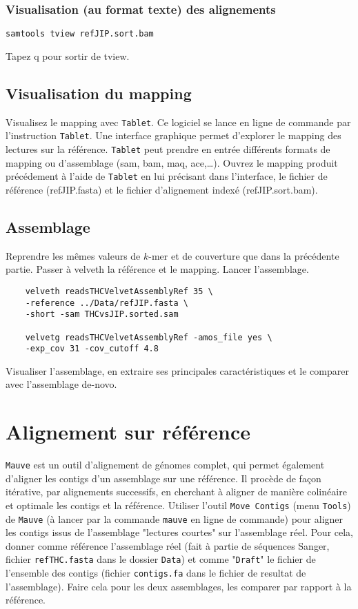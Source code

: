 \documentclass[a4paper,12pt]{article}
\begin{document}
\subsubsection*{Visualisation (au format texte) des alignements}
\begin{lstlisting}
samtools tview refJIP.sort.bam
\end{lstlisting}
Tapez q pour sortir de tview.



\subsection{Visualisation du mapping}
Visualisez le mapping avec \verb=Tablet=. Ce logiciel se lance en ligne de commande par l'instruction \verb=Tablet=. Une interface graphique permet d'explorer le mapping des lectures sur la référence. \verb=Tablet= peut prendre en entrée différents formats de mapping ou d'assemblage (sam, bam, maq, ace,\ldots). Ouvrez le mapping produit précédement à l'aide de \verb=Tablet= en lui précisant dans l'interface, le fichier de référence (refJIP.fasta) et le fichier d'alignement indexé (refJIP.sort.bam).

\subsection{Assemblage}
Reprendre les mêmes valeurs de $k$-mer et de couverture que dans la précédente partie. Passer à velveth la référence et le mapping. Lancer l'assemblage.

\begin{lstlisting}
	velveth readsTHCVelvetAssemblyRef 35 \
	-reference ../Data/refJIP.fasta \
	-short -sam THCvsJIP.sorted.sam 
	
	velvetg readsTHCVelvetAssemblyRef -amos_file yes \
	-exp_cov 31 -cov_cutoff 4.8
\end{lstlisting}

Visualiser l'assemblage, en extraire ses principales caractéristiques  et le comparer avec l'assemblage de-novo.

\section{Alignement sur référence}
\verb=Mauve= est un outil d'alignement de génomes complet, qui permet également d'aligner les contigs d'un assemblage sur une référence. Il procède de façon itérative, par alignements successifs, en cherchant à aligner de manière colinéaire et optimale les contigs et la référence.
Utiliser l'outil \verb=Move Contigs= (menu \verb=Tools=) de \verb=Mauve= (à lancer par la commande \verb=mauve= en ligne de commande) pour aligner les contigs issus de l'assemblage "lectures courtes" sur l'assemblage réel. Pour cela, donner comme référence l'assemblage réel (fait à partie de séquences Sanger, fichier \verb=refTHC.fasta= dans le dossier \verb=Data=) et comme "\verb=Draft=" le fichier de l'ensemble des contigs (fichier \verb=contigs.fa= dans le fichier de resultat de l'assemblage). Faire cela pour les deux assemblages, les comparer par rapport à la référence. 
\end{document}
